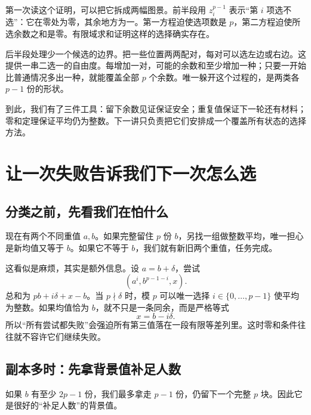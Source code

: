 \documentclass[11pt,a4paper,oneside,openany]{book}
\theoremstyle{definition}
\numberwithin{equation}{chapter}
\begin{document}
第一次读这个证明，可以把它拆成两幅图景。前半段用 $z_i^{p-1}$ 表示“第 $i$ 项选不选”：它在零处为零，其余地方为一。第一方程迫使选项数是 $p$，第二方程迫使所选余数之和是零。有限域求和证明这样的选择确实存在。

后半段处理少一个候选的边界。把一些位置两两配对，每对可以选左边或右边。这提供一串二选一的自由度。每增加一对，可能的余数和至少增加一种；只要一开始比普通情况多出一种，就能覆盖全部 $p$ 个余数。唯一躲开这个过程的，是两类各 $p-1$ 份的形状。

到此，我们有了三件工具：留下余数见证保证安全；重复值保证下一轮还有材料；零和定理保证平均仍为整数。下一讲只负责把它们安排成一个覆盖所有状态的选择方法。

\chapter{让一次失败告诉我们下一次怎么选}\label{ch:descent-finish}
\section{分类之前，先看我们在怕什么}
现在有两个不同重值 $a,b$。如果完整留住 $p$ 份 $b$，另找一组做整数平均，唯一担心是新均值又等于 $b$。如果它不等于 $b$，我们就有新旧两个重值，任务完成。

这看似是麻烦，其实是额外信息。设 $a=b+\delta$，尝试
\[(a^i,b^{p-1-i},x).
\]
总和为 $pb+i\delta+x-b$。当 $p\nmid\delta$ 时，模 $p$ 可以唯一选择 $i\in\{0,\ldots,p-1\}$ 使平均为整数。如果均值恰为 $b$，就不只是一条同余，而是严格等式
\[x=b-i\delta.
\]
所以“所有尝试都失败”会强迫所有第三值落在一段有限等差列里。这时零和条件往往就不容许它们继续失败。

\section{副本多时：先拿背景值补足人数}
如果 $b$ 有至少 $2p-1$ 份，我们最多拿走 $p-1$ 份，仍留下一个完整 $p$ 块。因此它是很好的“补足人数”的背景值。
\end{document}
